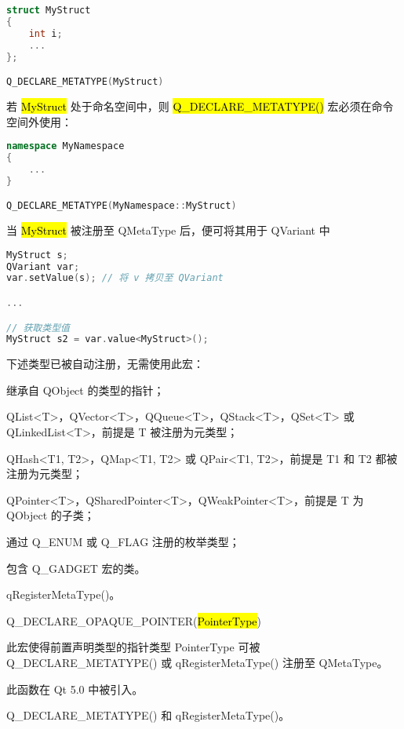 \begin{lstlisting}[language=C++]
struct MyStruct
{
    int i;
    ...
};

Q_DECLARE_METATYPE(MyStruct)
\end{lstlisting}

若 \hl{MyStruct} 处于命名空间中，则 \hl{Q\_DECLARE\_METATYPE()} 宏必须在命令空间外使用：

\begin{lstlisting}[language=C++]
namespace MyNamespace
{
    ...
}

Q_DECLARE_METATYPE(MyNamespace::MyStruct)
\end{lstlisting}

当 \hl{MyStruct} 被注册至 QMetaType 后，便可将其用于 QVariant 中

\begin{lstlisting}[language=C++]
MyStruct s;
QVariant var;
var.setValue(s); // 将 v 拷贝至 QVariant

...

// 获取类型值
MyStruct s2 = var.value<MyStruct>();
\end{lstlisting}

下述类型已被自动注册，无需使用此宏：

\begin{compactitem}
\item 继承自 QObject 的类型的指针；
\item QList<T>，QVector<T>，QQueue<T>，QStack<T>，QSet<T> 或 QLinkedList<T>，前提是 T 被注册为元类型；
\item QHash<T1, T2>，QMap<T1, T2> 或 QPair<T1, T2>，前提是 T1 和 T2 都被注册为元类型；
\item QPointer<T>，QSharedPointer<T>，QWeakPointer<T>，前提是 T 为 QObject 的子类；
\item 通过 Q\_ENUM 或 Q\_FLAG 注册的枚举类型；
\item 包含 Q\_GADGET 宏的类。
\end{compactitem}

\begin{seeAlso}
qRegisterMetaType()。
\end{seeAlso}


Q\_DECLARE\_OPAQUE\_POINTER(\hl{PointerType})

此宏使得前置声明类型的指针类型 PointerType 可被 Q\_DECLARE\_METATYPE() 或 qRegisterMetaType() 注册至 QMetaType。

此函数在 Qt 5.0 中被引入。

\begin{seeAlso}
Q\_DECLARE\_METATYPE() 和 qRegisterMetaType()。
\end{seeAlso}

